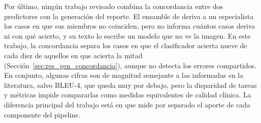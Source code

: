 Por último, ningún trabajo revisado combina la concordancia entre dos predictores con la generación del reporte. El
ensamble de \textcite{khan2025ensemble} deriva a un especialista los casos en que sus miembros no coinciden, pero no
informa cuántos casos deriva ni con qué acierto, y su texto lo escribe un modelo que no ve la imagen. En este trabajo,
la concordancia separa los casos en que el clasificador acierta nueve de cada diez de aquellos en que acierta la mitad
(Sección~\ref{sec:res_gen_concordancia}), aunque no detecta los errores compartidos. En conjunto, algunas cifras son de magnitud semejante a las informadas en la literatura, salvo BLEU-4, que queda muy por debajo, pero la disparidad de tareas y métricas impide compararlas como medidas equivalentes de calidad clínica. La diferencia principal del trabajo está en que
mide por separado el aporte de cada componente del pipeline.
